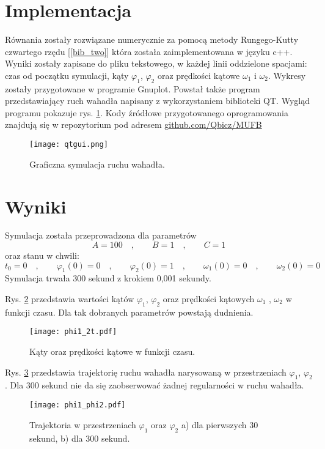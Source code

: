 \documentclass[11pt]{aghdpl}
\begin{document}
\section{Implementacja}
Równania zostały rozwiązane numerycznie za pomocą metody Rungego-Kutty czwartego rzędu [\ref{bib_two}] która została zaimplementowana w języku c++. Wyniki zostały zapisane do pliku tekstowego, w każdej linii oddzielone spacjami: czas od początku symulacji, kąty $\varphi_1$, $\varphi_2$ oraz prędkości kątowe $\omega_1$ i $\omega_2$. Wykresy zostały przygotowane w programie Gnuplot. Powstał także program przedstawiający ruch wahadła napisany z wykorzystaniem biblioteki QT. Wygląd programu pokazuje rys. \ref{QTgui}. Kody źródłowe przygotowanego oprogramowania znajdują się w repozytorium pod adresem \href{http://www.github.com/Qbicz/MUFB}{github.com/Qbicz/MUFB} 
\begin{figure}[h!]
	\centering
	\label{QTgui}
	\texttt{[image: qtgui.png]}
	\caption{Graficzna symulacja ruchu wahadła.}
\end{figure}

\section{Wyniki}
Symulacja została przeprowadzona dla parametrów 
\begin{equation}
	A = 100\quad , \qquad B = 1 \quad , \qquad C = 1
\end{equation} 
oraz stanu w chwili:
\begin{equation} \nonumber
	t_0=0 \quad , \qquad \varphi_1(0) = 0 \quad , \qquad 			\varphi_2(0) = 1 \quad , \qquad \omega_1(0) = 0 \quad , 		\qquad \omega_2(0) = 0
\end{equation}
Symulacja trwała 300 sekund z krokiem 0,001 sekundy.

Rys. \ref{phi1_2odt.} przedstawia wartości kątów $\varphi_1$, $\varphi_2$ oraz prędkości kątowych $\omega_1$ , $\omega_2$ w funkcji czasu. Dla tak dobranych parametrów powstają dudnienia.
\begin{figure}[t]
	\centering
	\label{phi1_2odt.}
	\texttt{[image: phi1\_2t.pdf]}
	\caption{Kąty oraz prędkości kątowe w funkcji czasu.}
\end{figure}

Rys. \ref{phi1_phi2} przedstawia trajektorię ruchu wahadła narysowaną w przestrzeniach $\varphi_1$, $\varphi_2$. Dla 300 sekund nie da się zaobserwować żadnej regularności w ruchu wahadła.
\begin{figure}[t]
	\centering
	\label{phi1_phi2}
	\texttt{[image: phi1\_phi2.pdf]}
	\caption{Trajektoria w przestrzeniach $\varphi_1$ oraz $\varphi_2$ \quad a) dla pierwszych 30 sekund, \quad b) dla 300 sekund.}
\end{figure}
\end{document}
